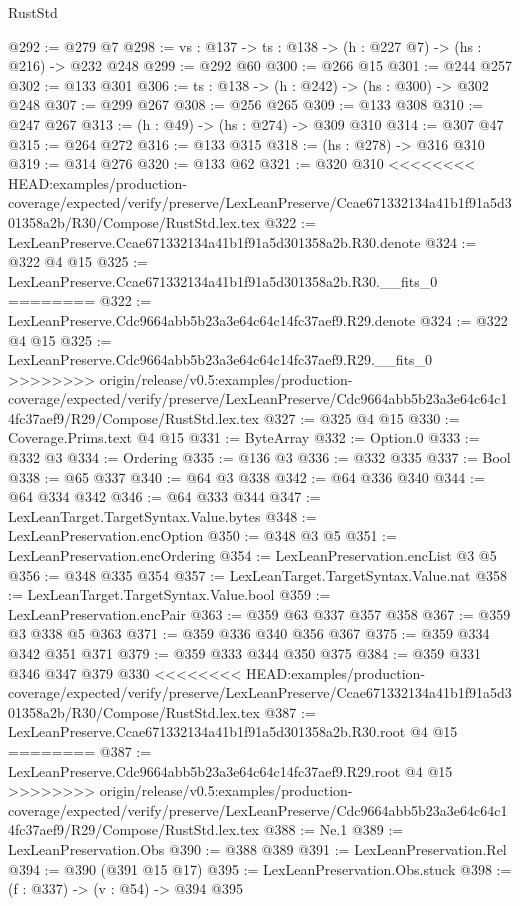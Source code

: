 \begin{lexlean}{RustStd}
\begin{coremodule}
{\begin{coremodule}
@292 := @279 @7
@298 := {vs : @137} -> {ts : @138} -> (h : @227 @7) -> (hs : @216) -> @232 @248
@299 := @292 @60
@300 := @266 @15
@301 := @244 @257
@302 := @133 @301
@306 := {ts : @138} -> (h : @242) -> (hs : @300) -> @302 @248
@307 := @299 @267
@308 := @256 @265
@309 := @133 @308
@310 := @247 @267
@313 := (h : @49) -> (hs : @274) -> @309 @310
@314 := @307 @47
@315 := @264 @272
@316 := @133 @315
@318 := (hs : @278) -> @316 @310
@319 := @314 @276
@320 := @133 @62
@321 := @320 @310
<<<<<<<< HEAD:examples/production-coverage/expected/verify/preserve/LexLeanPreserve/Ccae671332134a41b1f91a5d301358a2b/R30/Compose/RustStd.lex.tex
@322 := LexLeanPreserve.Ccae671332134a41b1f91a5d301358a2b.R30.denote
@324 := @322 @4 @15
@325 := LexLeanPreserve.Ccae671332134a41b1f91a5d301358a2b.R30.__fits_0
========
@322 := LexLeanPreserve.Cdc9664abb5b23a3e64c64c14fc37aef9.R29.denote
@324 := @322 @4 @15
@325 := LexLeanPreserve.Cdc9664abb5b23a3e64c64c14fc37aef9.R29.__fits_0
>>>>>>>> origin/release/v0.5:examples/production-coverage/expected/verify/preserve/LexLeanPreserve/Cdc9664abb5b23a3e64c64c14fc37aef9/R29/Compose/RustStd.lex.tex
@327 := @325 @4 @15
@330 := Coverage.Prims.text @4 @15
@331 := ByteArray
@332 := Option.{0}
@333 := @332 @3
@334 := Ordering
@335 := @136 @3
@336 := @332 @335
@337 := Bool
@338 := @65 @337
@340 := @64 @3 @338
@342 := @64 @336 @340
@344 := @64 @334 @342
@346 := @64 @333 @344
@347 := LexLeanTarget.TargetSyntax.Value.bytes
@348 := LexLeanPreservation.encOption
@350 := @348 @3 @5
@351 := LexLeanPreservation.encOrdering
@354 := LexLeanPreservation.encList @3 @5
@356 := @348 @335 @354
@357 := LexLeanTarget.TargetSyntax.Value.nat
@358 := LexLeanTarget.TargetSyntax.Value.bool
@359 := LexLeanPreservation.encPair
@363 := @359 @63 @337 @357 @358
@367 := @359 @3 @338 @5 @363
@371 := @359 @336 @340 @356 @367
@375 := @359 @334 @342 @351 @371
@379 := @359 @333 @344 @350 @375
@384 := @359 @331 @346 @347 @379 @330
<<<<<<<< HEAD:examples/production-coverage/expected/verify/preserve/LexLeanPreserve/Ccae671332134a41b1f91a5d301358a2b/R30/Compose/RustStd.lex.tex
@387 := LexLeanPreserve.Ccae671332134a41b1f91a5d301358a2b.R30.root @4 @15
========
@387 := LexLeanPreserve.Cdc9664abb5b23a3e64c64c14fc37aef9.R29.root @4 @15
>>>>>>>> origin/release/v0.5:examples/production-coverage/expected/verify/preserve/LexLeanPreserve/Cdc9664abb5b23a3e64c64c14fc37aef9/R29/Compose/RustStd.lex.tex
@388 := Ne.{1}
@389 := LexLeanPreservation.Obs
@390 := @388 @389
@391 := LexLeanPreservation.Rel
@394 := @390 (@391 @15 @17)
@395 := LexLeanPreservation.Obs.stuck
@398 := (f : @337) -> (v : @54) -> @394 @395

\end{coremodule}}
\end{coremodule}
\end{lexlean}
